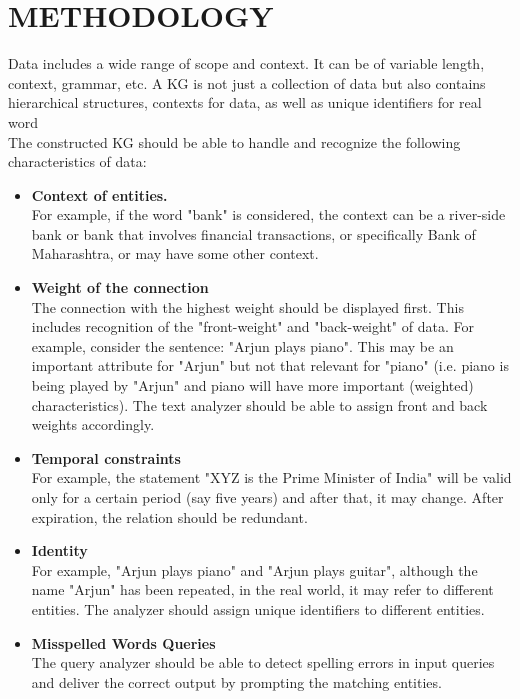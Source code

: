 \documentclass[conference]{IEEEtran}
\begin{document}
\section{METHODOLOGY}
Data includes a wide range of scope and context. It can be of variable length, context, grammar, etc.
A KG is not just a collection of data but also contains hierarchical structures, contexts for data, as well as unique identifiers for real word \cite{b8}
\\
The constructed KG should be able to handle and recognize the following characteristics of data:
\begin{itemize}
    \item\textbf{Context of entities.}\cite{b8}\\ 
    For example, if the word "bank" is considered, the context can be a river-side bank or bank that involves financial transactions, or specifically Bank of Maharashtra, or may have some other context.
    

    
	\item\textbf{Weight of the connection}
 \\
 The connection with the highest weight should be displayed first.
 This includes recognition of the "front-weight" and "back-weight" of data. For example, consider the sentence: "Arjun plays piano". This may be an important attribute for "Arjun" but not that relevant for "piano" (i.e. piano is being played by "Arjun" and piano will have more important (weighted) characteristics). The text analyzer should be able to assign front and back weights accordingly.

 
	\item\textbf{Temporal constraints} \cite{b8, b17}
 \\
 For example, the statement "XYZ is the Prime Minister of India" will be valid only for a certain period (say five years) and after that, it may change. After expiration, the relation should be redundant.

 
	\item\textbf{Identity} \cite{b8,b16}
 \\
 For example, "Arjun plays piano" and "Arjun plays guitar", although the name "Arjun" has been repeated, in the real world, it may refer to different entities. 
 The analyzer should assign unique identifiers to different entities.
	
 \item\textbf{Misspelled Words Queries} 
 \\
 The query analyzer should be able to detect spelling errors in input queries and deliver the correct output by prompting the matching entities.
 
\end{itemize}
\end{document}
